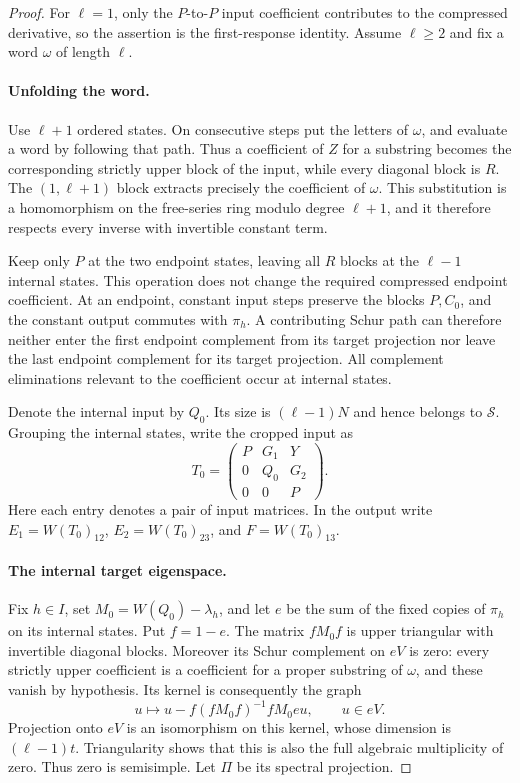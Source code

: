 \begin{proof}
For $\ell=1$, only the $P$-to-$P$ input coefficient contributes to the
compressed derivative, so the assertion is the first-response identity.
Assume $\ell\ge2$ and fix a word $\omega$ of length $\ell$.

\paragraph{Unfolding the word.}
Use $\ell+1$ ordered states.  On consecutive steps put the letters of
$\omega$, and evaluate a word by following that path.  Thus a coefficient
of $Z$ for a substring becomes the corresponding strictly upper block of
the input, while every diagonal block is $R$.  The $(1,\ell+1)$ block
extracts precisely the coefficient of $\omega$.  This substitution is a
homomorphism on the free-series ring modulo degree $\ell+1$, and it
therefore respects every inverse with invertible constant term.

Keep only $P$ at the two endpoint states, leaving all $R$ blocks at the
$\ell-1$ internal states.  This operation does not change the required
compressed endpoint coefficient.  At an endpoint, constant input steps
preserve the blocks $P,C_0$, and the constant output commutes with
$\pi_h$.  A contributing Schur path can therefore neither enter the
first endpoint complement from its target projection nor leave the last
endpoint complement for its target projection.  All complement
eliminations relevant to the coefficient occur at internal states.

Denote the internal input by $Q_0$.  Its size is $(\ell-1)N$ and hence
belongs to $\mathcal S$.  Grouping the internal
states, write the cropped input as
\[
 T_0=\begin{pmatrix}
 P&G_1&Y\\0&Q_0&G_2\\0&0&P
 \end{pmatrix}.
\]
Here each entry denotes a pair of input matrices.  In the output write
$E_1=W(T_0)_{12}$, $E_2=W(T_0)_{23}$, and $F=W(T_0)_{13}$.

\paragraph{The internal target eigenspace.}
Fix $h\in I$, set $M_0=W(Q_0)-\lambda_h$, and let $e$ be the sum of the
fixed copies of $\pi_h$ on its internal states.  Put $f=1-e$.
The matrix $fM_0f$ is upper triangular with invertible diagonal blocks.
Moreover its Schur complement on $eV$ is zero: every strictly upper
coefficient is a coefficient for a proper substring of $\omega$, and
these vanish by hypothesis.  Its kernel is consequently the graph
\[
 u\longmapsto u-f(fM_0f)^{-1}fM_0e u,
 \qquad u\in eV.
\]
Projection onto $eV$ is an isomorphism on this kernel, whose dimension is
$(\ell-1)t$.  Triangularity shows that this is also the full algebraic
multiplicity of zero.  Thus zero is semisimple.  Let $\Pi$ be its
spectral projection.


\end{proof}
